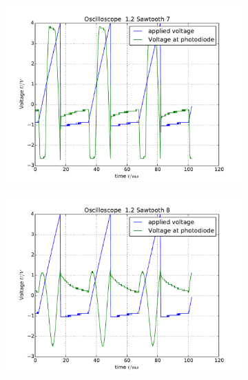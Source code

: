 \begin{figure}
\begin{subfigure}[b]{\picwidth}
        \includegraphics[width=\textwidth]{analysis/figures/12sawtooth7}
        \caption{}
    \end{subfigure}
    \begin{subfigure}[b]{\picwidth}
        \includegraphics[width=\textwidth]{analysis/figures/12sawtooth8}
        \caption{}
    \end{subfigure}
    \begin{subfigure}[b]{\picwidth}

\end{subfigure}
\end{figure}

